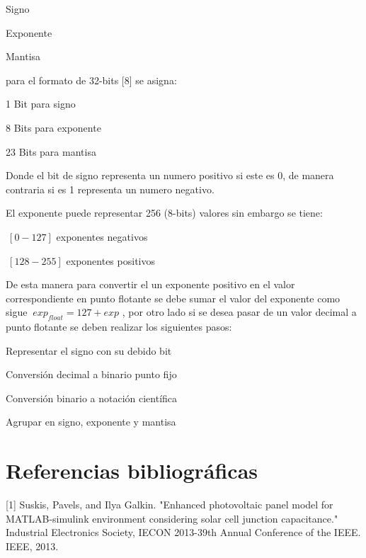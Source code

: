 \begin{compactitem}
\item Signo 
\item Exponente
\item Mantisa 
\end{compactitem}

para el formato  de 32-bits [8] se asigna: 

\begin{compactitem}
\item 1 Bit para signo 
\item 8 Bits para exponente
\item 23 Bits para mantisa 
\end{compactitem}

Donde el bit de signo representa un numero positivo si este es 0, de manera contraria si es 1 representa un numero negativo. 

El exponente puede representar 256 (8-bits) valores sin embargo se tiene:

\begin{compactitem}
\item $\ \left[0-127\right]$ exponentes negativos  
\item $\ \left[128-255\right]$ exponentes positivos
\end{compactitem}

De esta manera para convertir el un exponente positivo en el valor correspondiente en punto flotante se debe sumar el valor del exponente como sigue $\ exp_{float}=127+exp $ , por otro lado si se desea pasar de un valor decimal a punto flotante se deben realizar los siguientes pasos: 
\begin{compactitem}
\item Representar el signo con su debido bit
\item Conversión decimal a binario punto fijo   
\item Conversión binario a notación científica
\item Agrupar en signo, exponente y mantisa 
\end{compactitem}



 
\section{Referencias bibliográficas}

[1] Suskis, Pavels, and Ilya Galkin. "Enhanced photovoltaic panel model for MATLAB-simulink environment considering solar cell junction capacitance." Industrial Electronics Society, IECON 2013-39th Annual Conference of the IEEE. IEEE, 2013.

